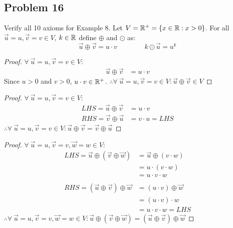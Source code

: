 \subsection*{Problem 16}
Verify all 10 axioms for Example 8. Let $V = \mathbb{R}^+ = \{x \in \mathbb{R}: x>0\}$. For all $\vec{u} = u,\vec{v} = v \in V$, $k\in \mathbb{R}$ define $\oplus$ and $\odot$ as:
\[
  \vec{u} \oplus \vec{v} = u \cdot v\qquad\qquad k \odot \vec{u} = u^k
\]
\begin{enumerate}
  \begin{proof}
    $\forall~\vec{u}=u,\vec{v}=v \in V$:
    \begin{align*}
      \vec{u} \oplus \vec{v} & = u \cdot v
    \end{align*}
    Since $u > 0$ and $v > 0$, $u \cdot v \in \mathbb{R}^+$. $\therefore \forall~\vec{u}=u,\vec{v}=v \in V: \vec{u} \oplus \vec{v} \in V$
  \end{proof}
  \begin{proof}
    $\forall~\vec{u}=u,\vec{v}=v \in V$:
    \begin{align*}
      LHS = \vec{u} \oplus \vec{v} & = u \cdot v       \\
      RHS = \vec{v} \oplus \vec{u} & = v \cdot u = LHS
    \end{align*}
    $\therefore \forall~\vec{u}=u,\vec{v}=v \in V: \vec{u} \oplus \vec{v} = \vec{v} \oplus \vec{u}$
  \end{proof}
  \begin{proof}
    $\forall~\vec{u}=u,\vec{v}=v,\vec{w}=w \in V$:
    \begin{align*}
      LHS = \vec{u} \oplus (\vec{v} \oplus \vec{w}) & = \vec{u} \oplus (v \cdot w) \\
                                                    & = u \cdot (v \cdot w)        \\
                                                    & = u \cdot v \cdot w          \\ \\
      RHS = (\vec{u} \oplus \vec{v}) \oplus \vec{w} & = (u \cdot v) \oplus \vec{w} \\
                                                    & = (u \cdot v) \cdot w        \\
                                                    & = u \cdot v \cdot w = LHS
    \end{align*}
    $\therefore \forall~\vec{u}=u,\vec{v}=v,\vec{w}=w \in V: \vec{u} \oplus (\vec{v} \oplus \vec{w}) = (\vec{u} \oplus \vec{v}) \oplus \vec{w}$

\end{proof}
\end{enumerate}
